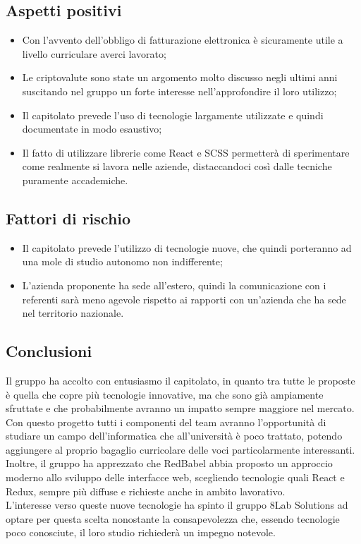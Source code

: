 \subsection{Aspetti positivi}
\begin{itemize}
	\item Con l'avvento dell'obbligo di fatturazione elettronica è sicuramente
	utile a livello curriculare averci lavorato;
	\item Le criptovalute sono state un argomento molto discusso negli ultimi anni 
suscitando nel gruppo un forte interesse nell'approfondire il loro utilizzo;
	\item Il capitolato prevede l'uso di tecnologie largamente utilizzate e quindi 
documentate in modo esaustivo;
	\item Il fatto di utilizzare librerie come React e SCSS permetterà di
	sperimentare come realmente si lavora nelle aziende, distaccandoci così dalle 
tecniche puramente accademiche.
\end{itemize}

\subsection{Fattori di rischio}
\begin{itemize}
	\item Il capitolato prevede l'utilizzo di tecnologie nuove, che quindi 
porteranno ad una mole di studio autonomo non indifferente;
	\item L'azienda proponente ha sede all'estero, quindi la comunicazione con i 
referenti sarà meno agevole rispetto ai rapporti con un'azienda che ha sede nel 
territorio nazionale.
\end{itemize}

\subsection{Conclusioni} Il gruppo ha accolto con entusiasmo il capitolato, in 
quanto tra tutte le proposte è quella che copre più tecnologie innovative, ma 
che sono già ampiamente sfruttate e che probabilmente avranno un impatto sempre 
maggiore nel mercato. Con questo progetto tutti i componenti del team avranno 
l'opportunità di studiare un campo dell'informatica che all'università è poco 
trattato, potendo aggiungere al proprio bagaglio curricolare delle voci 
particolarmente interessanti. Inoltre, il gruppo ha apprezzato che RedBabel abbia
proposto un approccio moderno allo sviluppo delle interfacce web, scegliendo 
tecnologie quali React e Redux, sempre più diffuse e richieste anche in ambito lavorativo.\\
L'interesse verso queste nuove tecnologie ha spinto il gruppo 8Lab Solutions ad 
optare per questa scelta nonostante la consapevolezza che, essendo tecnologie 
poco conosciute, il loro studio richiederà un impegno notevole.


